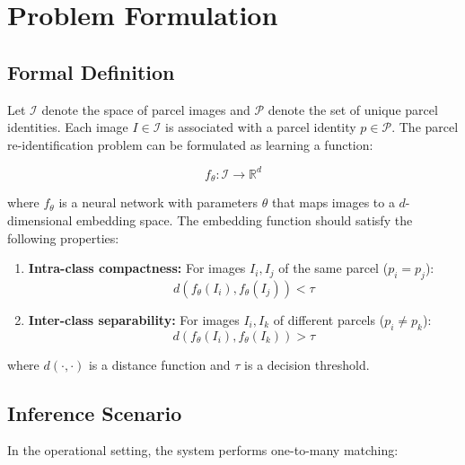 \documentclass[12pt,a4paper]{article}
\begin{document}
\section{Problem Formulation}
\label{sec:problem}

\subsection{Formal Definition}

Let $\mathcal{I}$ denote the space of parcel images and $\mathcal{P}$ denote the set of unique parcel identities. Each image $I \in \mathcal{I}$ is associated with a parcel identity $p \in \mathcal{P}$. The parcel re-identification problem can be formulated as learning a function:

\begin{equation}
    f_\theta: \mathcal{I} \rightarrow \mathbb{R}^d
\end{equation}

where $f_\theta$ is a neural network with parameters $\theta$ that maps images to a $d$-dimensional embedding space. The embedding function should satisfy the following properties:

\begin{enumerate}
    \item \textbf{Intra-class compactness:} For images $I_i, I_j$ of the same parcel ($p_i = p_j$):
    \begin{equation}
        d(f_\theta(I_i), f_\theta(I_j)) < \tau
    \end{equation}
    
    \item \textbf{Inter-class separability:} For images $I_i, I_k$ of different parcels ($p_i \neq p_k$):
    \begin{equation}
        d(f_\theta(I_i), f_\theta(I_k)) > \tau
    \end{equation}
\end{enumerate}

where $d(\cdot, \cdot)$ is a distance function and $\tau$ is a decision threshold.

\subsection{Inference Scenario}

In the operational setting, the system performs one-to-many matching:
\end{document}
